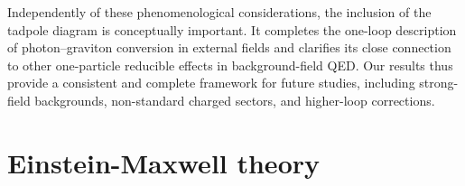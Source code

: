 \documentclass[a4paper,11pt]{article}
\begin{document}
Independently of these phenomenological considerations, the inclusion of the tadpole diagram is conceptually important. It completes the one-loop description of photon–graviton conversion in external fields and clarifies its close connection to other one-particle reducible effects in background-field QED. Our results thus provide a consistent and complete framework for future studies, including strong-field backgrounds, non-standard charged sectors, and higher-loop corrections.



\appendix
\section{Einstein-Maxwell theory}
\label{appA}
\renewcommand{\theequation}{A.\arabic{equation}}
\setcounter{equation}{0}
\end{document}
